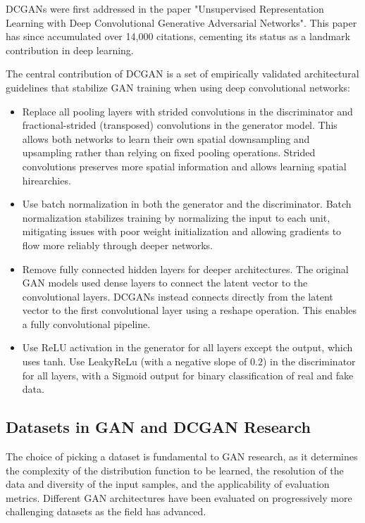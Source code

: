 \documentclass[twocolumn]{article}
\begin{document}
DCGANs were first addressed in the paper "Unsupervised Representation Learning with Deep Convolutional Generative Adversarial
Networks". This paper has since accumulated over 14,000 citations, cementing its status as a landmark contribution in deep learning.

The central contribution of DCGAN is a set of empirically validated architectural guidelines that stabilize
GAN training when using deep convolutional networks:

\begin{itemize}
    \item Replace all pooling layers with strided convolutions in the discriminator and fractional-strided (transposed) convolutions
        in the generator model. This allows both networks to learn their own spatial downsampling and upsampling rather than
        relying on fixed pooling operations. Strided convolutions preserves more spatial information and allows learning spatial
        hirearchies.
    \item Use batch normalization in both the generator and the discriminator. Batch normalization stabilizes training by normalizing
        the input to each unit, mitigating issues with poor weight initialization and allowing gradients to flow more reliably through
        deeper networks.
    \item Remove fully connected hidden layers for deeper architectures. The original GAN models used dense layers to connect
        the latent vector to the convolutional layers. DCGANs instead connects directly from the latent vector to the first
        convolutional layer using a reshape operation. This enables a fully convolutional pipeline.
    \item Use ReLU activation in the generator for all layers except the output, which uses tanh. Use LeakyReLu (with a negative slope
        of $0.2$) in the discriminator for all layers, with a Sigmoid output for binary classification of real and fake data.
\end{itemize}

\subsection{Datasets in GAN and DCGAN Research}

The choice of picking a dataset is fundamental to GAN research, as it determines the complexity
of the distribution function to be learned, the resolution of the data and diversity of the input samples, and
the applicability of evaluation metrics. Different GAN architectures have been evaluated on progressively more
challenging datasets as the field has advanced.
\end{document}
